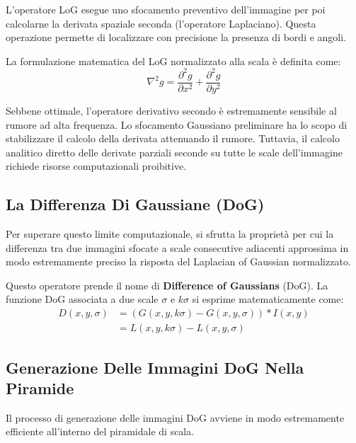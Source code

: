﻿\documentclass[11pt, a4paper]{article}
\begin{document}
L'operatore LoG esegue uno sfocamento preventivo dell'immagine per poi calcolarne la derivata spaziale seconda (l'operatore Laplaciano). Questa operazione permette di localizzare con precisione la presenza di bordi e angoli.


La formulazione matematica del LoG normalizzato alla scala è definita come:
\[ \nabla^2 g = \frac{\partial^2 g}{\partial x^2} + \frac{\partial^2 g}{\partial y^2} \]

Sebbene ottimale, l'operatore derivativo secondo è estremamente sensibile al rumore ad alta frequenza. Lo sfocamento Gaussiano preliminare ha lo scopo di stabilizzare il calcolo della derivata attenuando il rumore. Tuttavia, il calcolo analitico diretto delle derivate parziali seconde su tutte le scale dell'immagine richiede risorse computazionali proibitive.

\subsection{La Differenza Di Gaussiane (DoG)}

Per superare questo limite computazionale, si sfrutta la proprietà per cui la differenza tra due immagini sfocate a scale consecutive adiacenti approssima in modo estremamente preciso la risposta del Laplacian of Gaussian normalizzato.

Questo operatore prende il nome di \textbf{Difference of Gaussians} (DoG). La funzione DoG associata a due scale $\sigma$ e $k\sigma$ si esprime matematicamente come:
\begin{align*}
D(x, y, \sigma) &= \left( G(x, y, k\sigma) - G(x, y, \sigma) \right) * I(x, y) \\
&= L(x, y, k\sigma) - L(x, y, \sigma)
\end{align*}

\subsection{Generazione Delle Immagini DoG Nella Piramide}

Il processo di generazione delle immagini DoG avviene in modo estremamente efficiente all'interno del piramidale di scala.

\end{document}
